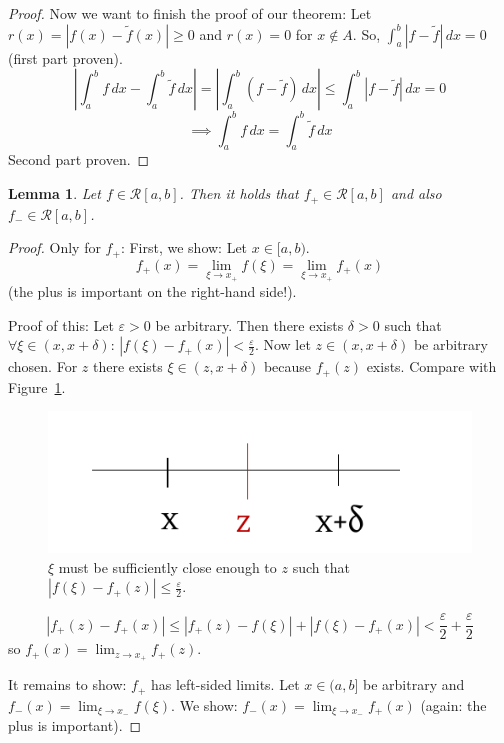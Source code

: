 \documentclass{article}
\newtheorem{lemma}{Lemma}  \numberwithin{lemma}{section}
\newcommand{\card}[1]{\left|#1\right|}
\begin{document}
\begin{proof}
  Now we want to finish the proof of our theorem: Let $r(x) = \card{f(x) - \tilde f(x)} \geq 0$ and $r(x) = 0$ for $x \not\in A$.
  So, $\int_a^b \card{f - \tilde f} \, dx = 0$ (first part proven).
  \[ \card{\int_a^b f \, dx - \int_a^b \tilde f \, dx} = \card{\int_a^b (f - \tilde f) \, dx} \leq \int_a^b \card{f - \tilde f} \, dx = 0 \]
  \[ \implies \int_a^b f\, dx = \int_a^b \tilde f \, dx \]
  Second part proven.
\end{proof}

\begin{lemma} %
  Let $f \in \mathcal R[a,b]$. Then it holds that $f_+ \in \mathcal R[a,b]$ and also $f_- \in \mathcal R[a,b]$.
\end{lemma}
\begin{proof}
  Only for $f_+$: First, we show: Let $x \in [a,b)$.
  \[ f_+(x) = \lim_{\xi \to x_+} f(\xi) = \lim_{\xi \to x_+} f_+(x) \]
  (the plus is important on the right-hand side!).

  Proof of this: Let $\varepsilon > 0$ be arbitrary. Then there exists $\delta > 0$ such that
  $\forall \xi \in (x, x + \delta)$: $\card{f(\xi) - f_+(x)} < \frac\varepsilon2$.
  Now let $z \in (x, x + \delta)$ be arbitrary chosen. For $z$ there exists $\xi \in (z, x + \delta)$ because $f_+(z)$ exists.
  Compare with Figure~\ref{img:xz}.

  \begin{figure}[t]
    \begin{center}
      \includegraphics{img/20_x_z.pdf}
      \caption{$\xi$ must be sufficiently close enough to $z$ such that $\card{f(\xi) - f_+(z)} \leq \frac\varepsilon2$.}
      \label{img:xz}
    \end{center}
  \end{figure}

  \[ \card{f_+(z) - f_+(x)} \leq \card{f_+(z) - f(\xi)} + \card{f(\xi) - f_+(x)} < \frac\varepsilon2 + \frac\varepsilon2 \]
  so $f_+(x) = \lim_{z \to x_+} f_+(z)$.

  It remains to show: $f_+$ has left-sided limits.
  Let $x \in (a,b]$ be arbitrary and $f_-(x) = \lim_{\xi \to x_-} f(\xi)$. We show: $f_-(x) = \lim_{\xi \to x_-} f_+(x)$ (again: the plus is important).


\end{proof}
\end{document}
